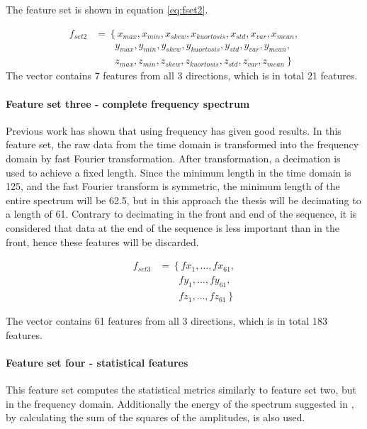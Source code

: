 \documentclass[USenglish]{ifimaster}  %
\begin{document}
The feature set is shown in equation \ref{eq:fset2}. 
	
\begin{align}\label{eq:fset2}
	f_{set2} &= \left\{ x_{max},x_{min},x_{skew},x_{kuortosis},x_{std},x_{var},x_{mean}, \right.\nonumber\\
	&\qquad \left. {} y_{max},y_{min},y_{skew},y_{kuortosis},y_{std},y_{var},y_{mean}, \right.\nonumber\\
	&\qquad \left. {} z_{max},z_{min},z_{skew},z_{kuortosis},z_{std},z_{var},z_{mean} \right\}
\end{align}
The vector contains 7 features from all 3 directions, which is in total 21 features. 
	
\paragraph{Feature set three - complete frequency spectrum} 
Previous work has shown that using frequency has given good results. In this feature set, the raw data from the time domain is transformed into the frequency domain by fast Fourier transformation. After transformation, a decimation is used to achieve a fixed length. Since the minimum length in the time domain is 125, and the fast Fourier transform is symmetric, the minimum length of the entire spectrum will be 62.5, but in this approach the thesis will be decimating to a length of 61. Contrary to decimating in the front and end of the sequence, it is considered that data at the end of the sequence is less important than in the front, hence these features will be discarded.
	
\begin{align}\label{eq:f1}
f_{set3} &= \left\{ fx_1,\dotsc,fx_{61}, \right.\nonumber\\
&\qquad \left. {} fy_1, \dotsc,fy_{61}, \right.\nonumber\\
&\qquad \left. {} fz_1,\dotsc,fz_{61}\right\}
\end{align}

The vector contains 61 features from all 3 directions, which is in total 183 features. 
	
\paragraph{Feature set four - statistical features} 
This feature set computes the statistical metrics similarly to feature set two, but in the frequency domain. Additionally the energy of the spectrum suggested in \cite{26b23e912c654fe4b7478fd910130195}, by calculating the sum of the squares of the amplitudes, is also used.
	
\end{document}

